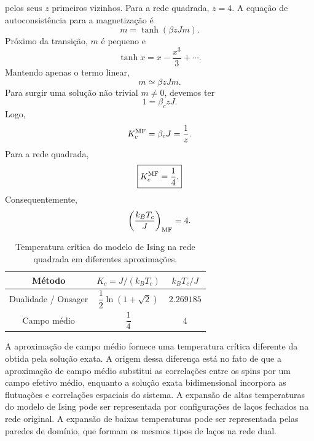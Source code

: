 \documentclass[11pt,a4paper]{article}
\begin{document}
pelos seus \(z\) primeiros vizinhos. Para a rede quadrada, \(z=4\). A equação de autoconsistência para a magnetização é
%
\begin{equation}
    m
    =
    \tanh(\beta zJm).
    \label{eq:mf_self_consistency}
\end{equation}
%
Próximo da transição, \(m\) é pequeno e
%
\begin{equation}
    \tanh x=x-\frac{x^3}{3}+\cdots.
\end{equation}
%
Mantendo apenas o termo linear,
%
\begin{equation}
    m\simeq\beta zJm.
\end{equation}
%
Para surgir uma solução não trivial \(m\neq0\), devemos ter
\begin{equation}
    1=\beta_c zJ.
\end{equation}
%
Logo,
%
\begin{equation}
    K_c^{\rm MF}
    =
    \beta_cJ
    =
    \frac1z.
\end{equation}
%
Para a rede quadrada,
%
\begin{equation}
    \boxed{
    K_c^{\rm MF}=\frac14.
    }
\end{equation}
%
Consequentemente,
%
\begin{equation}
    \left(\frac{k_BT_c}{J}\right)_{\rm MF}
    =4.
    \label{eq:Tc_MF}
\end{equation}
%
\begin{table}[H]
    \centering
    \caption{Temperatura crítica do modelo de Ising na rede quadrada em
    diferentes aproximações.}
    \label{tab:Tc_comparison}
    \begin{tabular}{c c c}
        \toprule
        Método & \(K_c=J/(k_BT_c)\) & \(k_BT_c/J\) \\
        \midrule
        Dualidade / Onsager
        & \(\dfrac12\ln(1+\sqrt2)\)
        & \(2.269185\) \\[0.3cm]

        Campo médio
        & \(\dfrac14\)
        & \(4\) \\
        \bottomrule
    \end{tabular}
\end{table}
%
A aproximação de campo médio fornece uma temperatura crítica diferente da
obtida pela solução exata. A origem dessa diferença está no fato de que a
aproximação de campo médio substitui as correlações entre os spins por um
campo efetivo médio, enquanto a solução exata bidimensional incorpora as flutuações e correlações espaciais do sistema. A expansão de altas temperaturas do modelo de Ising pode ser representada por configurações de laços fechados na rede original. A expansão de baixas temperaturas pode ser representada pelas paredes de domínio, que formam os mesmos tipos de laços na rede dual. 
\end{document}
